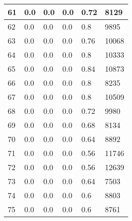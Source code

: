\begin{longtable}{|l|l|l|l|l|l|}
61 & 0.0 & 0.0 & 0.0 & 0.72 & 8129 \\ \hline 
62 & 0.0 & 0.0 & 0.0 & 0.8 & 9895 \\ \hline 
63 & 0.0 & 0.0 & 0.0 & 0.76 & 10068 \\ \hline 
64 & 0.0 & 0.0 & 0.0 & 0.8 & 10333 \\ \hline 
65 & 0.0 & 0.0 & 0.0 & 0.84 & 10873 \\ \hline 
66 & 0.0 & 0.0 & 0.0 & 0.8 & 8235 \\ \hline 
67 & 0.0 & 0.0 & 0.0 & 0.8 & 10509 \\ \hline 
68 & 0.0 & 0.0 & 0.0 & 0.72 & 9980 \\ \hline 
69 & 0.0 & 0.0 & 0.0 & 0.68 & 8134 \\ \hline 
70 & 0.0 & 0.0 & 0.0 & 0.64 & 8892 \\ \hline 
71 & 0.0 & 0.0 & 0.0 & 0.56 & 11746 \\ \hline 
72 & 0.0 & 0.0 & 0.0 & 0.56 & 12639 \\ \hline 
73 & 0.0 & 0.0 & 0.0 & 0.64 & 7503 \\ \hline 
74 & 0.0 & 0.0 & 0.0 & 0.6 & 8803 \\ \hline 
75 & 0.0 & 0.0 & 0.0 & 0.6 & 8761 \\ \hline 
\end{longtable}